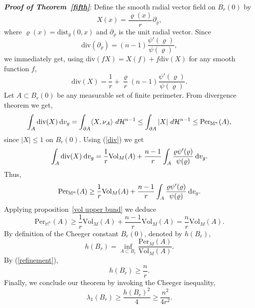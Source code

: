 \documentclass[a4paper,11pt,reqno]{amsart}
\renewcommand\eqref[1]{(\ref{#1})}
\theoremstyle{plain}
\numberwithin{equation}{section} \allowdisplaybreaks
\newcommand{\dvg}{\: {\rm d}v_{g}}
\newcommand{\m}{\mathbb{M}^n}
\begin{document}
\textit{\textbf{Proof of Theorem~\ref{fifth}}}: Define the smooth radial vector field on $B_r(0)$ by
\begin{equation*}
    X(x)=\frac{\varrho(x)}{r}\partial _\varrho,
\end{equation*}
where $\varrho(x)=\text{dist}_g(0,x)$ and $\partial_ \varrho$ is the unit radial vector. Since
\begin{equation*}
    \text{div}(\partial_\varrho)= (n-1)\frac{\psi'(\varrho)}{\psi(\varrho)},
\end{equation*}
we immediately get, using $\text{div}(fX)=X(f)+f\text{div}(X)$ for any smooth function $f$,
\begin{equation}\label{div}
    \text{div}(X)= \frac{1}{r}+\frac{\varrho}{r}(n-1)\frac{\psi'(\varrho)}{\psi(\varrho)}.
\end{equation}
Let $A\subset B_r(0)$ be any measurable set of finite perimeter. From divergence theorem we get,
\begin{equation*}
    \int_{A}\text{div}(X)\dvg=\int_{\partial A}\langle X,\nu_A\rangle\ d\mathcal{H}^{n-1}\leq \int_{\partial A}|X|\ d\mathcal{H}^{n-1}\leq \text{Per}_{\m}(A),
\end{equation*}
since $|X|\leq 1$ on $B_r(0)$. Using \eqref{div} we get
\begin{equation*}
    \int_{A}\text{div}(X)\dvg= \frac{1}{r}\text{Vol}_{M}(A)+\frac{n-1}{r}\int_{A}\frac{\varrho \psi'(\varrho)}{\psi(\varrho)}\dvg.
\end{equation*}
Thus,
\begin{equation*}
    \text{Per}_{\m}(A) \geq \frac{1}{r}\text{Vol}_{M}(A)+\frac{n-1}{r}\int_{A}\frac{\varrho \psi'(\varrho)}{\psi(\varrho)}\dvg.
\end{equation*}
Applying proposition~\ref{vol upper bund} we deduce
\begin{equation}\label{refinement}
    \text{Per}_{\m}(A) \geq \frac{1}{r}\text{Vol}_{M}(A)+\frac{n-1}{r}\text{Vol}_{M}(A)=\frac{n}{r}\text{Vol}_{M}(A).
\end{equation}
By definition of the Cheeger constant $B_r(0)$, denoted by $h(B_r)$,
\begin{equation*}
    h(B_r)= \inf_{A\subset B_r}\frac{\text{Per}_{M}(A)}{\text{Vol}_{M}(A)}.
\end{equation*}
By \eqref{refinement},
\begin{equation*}
    h(B_r)\geq \frac{n}{r}.
\end{equation*}
Finally, we conclude our theorem by invoking the Cheeger inequality,
\begin{equation*}
    \lambda_1(B_r)\geq \frac{h(B_r)^2}{4}\geq \frac{n^2}{4r^2}.
\end{equation*}
\end{document}
